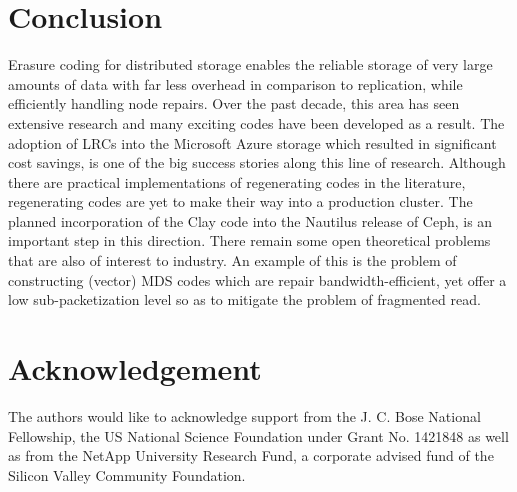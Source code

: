 \begin{multicols}{2}
\section{Conclusion}

Erasure coding for distributed storage enables the reliable storage of very large amounts of data with far less overhead in comparison to replication, while efficiently handling node repairs. Over the past decade, this area has seen extensive research and  many exciting codes have been developed as a result. The adoption of LRCs into the Microsoft Azure storage which resulted in significant cost savings, is one of the big success stories along this line of research. Although there are practical implementations of regenerating codes in the literature, regenerating codes are yet to make their way into a production cluster. The planned incorporation of the Clay code into the Nautilus release of Ceph, is an important step in this direction. There remain some open theoretical problems that are also of interest to industry. An example of this is the problem of constructing (vector) MDS codes which are repair bandwidth-efficient, yet offer a low sub-packetization level so as to mitigate the problem of fragmented read.

\section{Acknowledgement}
The authors would like to acknowledge support from the J. C. Bose National Fellowship, the US National Science
Foundation under Grant No. 1421848 as well as from the NetApp University Research Fund, a corporate advised fund of the Silicon Valley Community Foundation.


\end{multicols}
